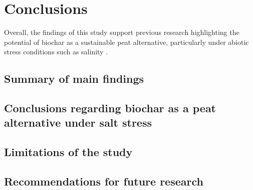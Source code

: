 \chapter{Conclusions}

Overall, the findings of this study support previous research highlighting the potential of biochar as a sustainable peat alternative, particularly under abiotic stress conditions such as salinity \textcite{Dumroese2018, Joseph2021}.

\section{Summary of main findings}

\section{Conclusions regarding biochar as a peat alternative under salt stress}

\section{Limitations of the study}

\section{Recommendations for future research}
